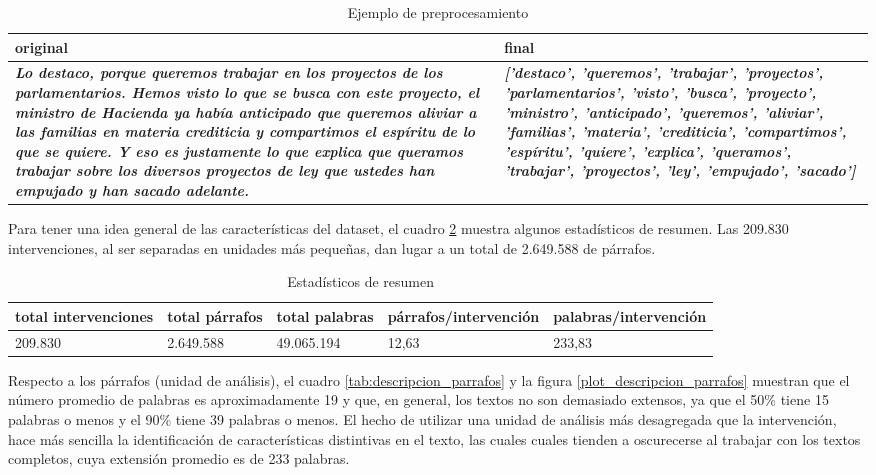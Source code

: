 \documentclass[
  12pt,
]{article}
\begin{document}
\begin{table}[H]

\caption{\label{tab:ejemplo_preprocesamiento}Ejemplo de preprocesamiento}
\centering
\begin{tabular}[t]{>{\raggedright\arraybackslash}p{15em}>{\raggedright\arraybackslash}p{15em}}
\toprule
original & final\\
\midrule
\em{\textbf{Lo destaco, porque queremos trabajar en los proyectos de los parlamentarios. Hemos visto lo que se busca con este proyecto, el ministro de Hacienda ya había anticipado que queremos aliviar  a las familias en materia crediticia y compartimos el espíritu de lo que se quiere. Y eso es justamente lo que explica  que queramos trabajar sobre los diversos proyectos de ley que ustedes han empujado y han sacado adelante.}} & \em{\textbf{{}['destaco', 'queremos', 'trabajar', 'proyectos', 'parlamentarios', 'visto', 'busca', 'proyecto', 'ministro',  'anticipado', 'queremos', 'aliviar', 'familias', 'materia', 'crediticia', 'compartimos', 'espíritu',  'quiere', 'explica', 'queramos', 'trabajar', 'proyectos', 'ley', 'empujado', 'sacado']}}\\
\bottomrule
\end{tabular}
\end{table}

Para tener una idea general de las características del dataset, el
cuadro \ref{tab:descripcion_dataset} muestra algunos estadísticos de
resumen. Las 209.830 intervenciones, al ser separadas en unidades más
pequeñas, dan lugar a un total de 2.649.588 de párrafos.

\begin{table}[H]

\caption{\label{tab:descripcion_dataset}Estadísticos de resumen}
\centering
\begin{tabular}[t]{lllll}
\toprule
total intervenciones & total párrafos & total palabras & párrafos/intervención & palabras/intervención\\
\midrule
209.830 & 2.649.588 & 49.065.194 & 12,63 & 233,83\\
\bottomrule
\end{tabular}
\end{table}

Respecto a los párrafos (unidad de análisis), el cuadro
\ref{tab:descripcion_parrafos} y la figura
\ref{plot_descripcion_parrafos} muestran que el número promedio de
palabras es aproximadamente 19 y que, en general, los textos no son
demasiado extensos, ya que el 50\% tiene 15 palabras o menos y el 90\%
tiene 39 palabras o menos. El hecho de utilizar una unidad de análisis
más desagregada que la intervención, hace más sencilla la identificación
de características distintivas en el texto, las cuales cuales tienden a
oscurecerse al trabajar con los textos completos, cuya extensión
promedio es de 233 palabras.
\end{document}
